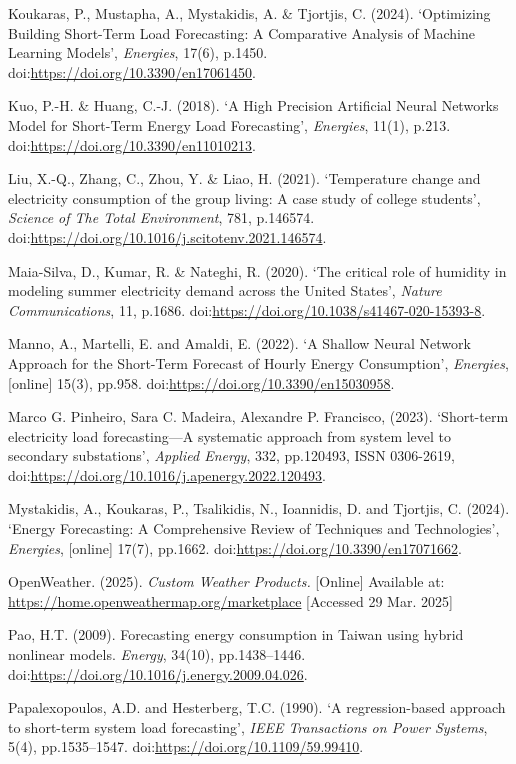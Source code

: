 \documentclass[mstat,12pt]{unswthesis}
\begin{document}
\begin{hangparas}{.25in}{1}
Koukaras, P., Mustapha, A., Mystakidis, A. \& Tjortjis, C. (2024). ‘Optimizing Building Short-Term Load Forecasting: A Comparative Analysis of Machine Learning Models’, \textit{Energies}, 17(6), p.1450. doi:\url{https://doi.org/10.3390/en17061450}.

Kuo, P.-H. \& Huang, C.-J. (2018). ‘A High Precision Artificial Neural Networks Model for Short-Term Energy Load Forecasting’, \textit{Energies}, 11(1), p.213. doi:\url{https://doi.org/10.3390/en11010213}.

Liu, X.-Q., Zhang, C., Zhou, Y. \& Liao, H. (2021). ‘Temperature change and electricity consumption of the group living: A case study of college students’, \textit{Science of The Total Environment}, 781, p.146574. doi:\url{https://doi.org/10.1016/j.scitotenv.2021.146574}.

Maia-Silva, D., Kumar, R. \& Nateghi, R. (2020). ‘The critical role of humidity in modeling summer electricity demand across the United States’, \textit{Nature Communications}, 11, p.1686. doi:\url{https://doi.org/10.1038/s41467-020-15393-8}.

Manno, A., Martelli, E. and Amaldi, E. (2022). ‘A Shallow Neural Network Approach for the Short-Term Forecast of Hourly Energy Consumption’, \textit{Energies}, [online] 15(3), pp.958. doi:\url{https://doi.org/10.3390/en15030958}. 

Marco G. Pinheiro, Sara C. Madeira, Alexandre P. Francisco, (2023). ‘Short-term electricity load forecasting—A systematic approach from system level to secondary substations’, \textit{Applied Energy}, 332, pp.120493, ISSN 0306-2619, doi:\url{https://doi.org/10.1016/j.apenergy.2022.120493}.  

Mystakidis, A., Koukaras, P., Tsalikidis, N., Ioannidis, D. and Tjortjis, C. (2024). ‘Energy Forecasting: A Comprehensive Review of Techniques and Technologies’, \textit{Energies}, [online] 17(7), pp.1662. doi:\url{https://doi.org/10.3390/en17071662}.  

OpenWeather. (2025). \textit{Custom Weather Products.} [Online] Available at: \url{https://home.openweathermap.org/marketplace} [Accessed 29 Mar. 2025] 

Pao, H.T. (2009). Forecasting energy consumption in Taiwan using hybrid nonlinear models. \textit{Energy}, 34(10), pp.1438–1446. doi:\url{https://doi.org/10.1016/j.energy.2009.04.026}. 

Papalexopoulos, A.D. and Hesterberg, T.C. (1990). ‘A regression-based approach to short-term system load forecasting’, \textit{IEEE Transactions on Power Systems}, 5(4), pp.1535–1547. doi:\url{https://doi.org/10.1109/59.99410}.  


\end{hangparas}
\end{document}
